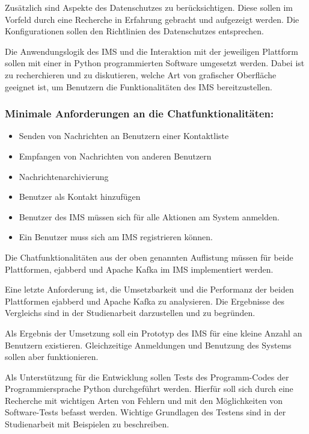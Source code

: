 \documentclass[a4paper,titlepage,halfparskip,12pt]{scrreprt}
\begin{document}
\begin{onehalfspacing}
Zusätzlich sind Aspekte des Datenschutzes zu berücksichtigen. Diese sollen im Vorfeld durch eine Recherche in Erfahrung gebracht und aufgezeigt werden. Die Konfigurationen sollen den Richtlinien des Datenschutzes entsprechen.

Die Anwendungslogik des \acs{IMS} und die Interaktion mit der jeweiligen Plattform sollen mit einer in Python programmierten Software umgesetzt werden. Dabei ist zu recherchieren und zu diskutieren, welche Art von grafischer Oberfläche geeignet ist, um Benutzern die Funktionalitäten des \acs{IMS} bereitzustellen.

\subsubsection*{Minimale Anforderungen an die Chatfunktionalitäten:}

\begin{itemize}
\item Senden von Nachrichten an Benutzern einer Kontaktliste
\item Empfangen von Nachrichten von anderen Benutzern
\item Nachrichtenarchivierung
\item Benutzer als Kontakt hinzufügen
\item Benutzer des \acs{IMS} müssen sich für alle Aktionen am System anmelden.
\item Ein Benutzer muss sich am \acs{IMS} registrieren können.
\end{itemize}

Die Chatfunktionalitäten aus der oben genannten Auflistung müssen für beide Plattformen, ejabberd und Apache Kafka im \acs{IMS} implementiert werden.

Eine letzte Anforderung ist, die Umsetzbarkeit und die Performanz der beiden Plattformen ejabberd und Apache Kafka zu analysieren. Die Ergebnisse des Vergleichs sind in der Studienarbeit darzustellen und zu begründen.

Als Ergebnis der Umsetzung soll ein Prototyp des \acs{IMS} für eine kleine Anzahl an Benutzern existieren. Gleichzeitige Anmeldungen und Benutzung des Systems sollen aber funktionieren.

Als Unterstützung für die Entwicklung sollen Tests des Programm-Codes der Programmiersprache Python durchgeführt werden. Hierfür soll sich durch eine Recherche mit wichtigen Arten von Fehlern und mit den Möglichkeiten von Software-Tests befasst werden. Wichtige Grundlagen des Testens sind in der Studienarbeit mit Beispielen zu beschreiben.


\end{onehalfspacing}
\end{document}
